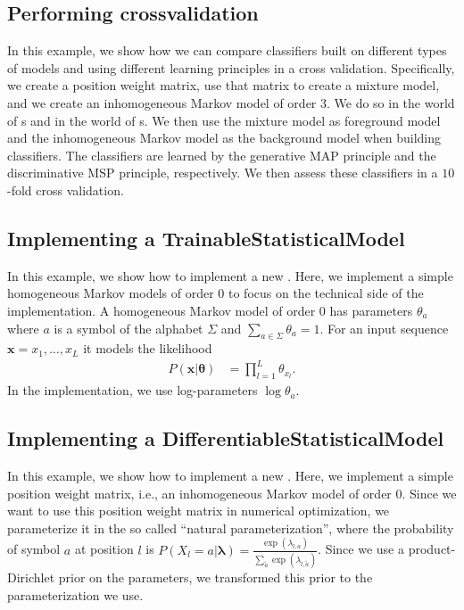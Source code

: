 \subsection{Performing crossvalidation}
In this example, we show how we can compare classifiers built on different types of models and using different learning principles in a cross validation. Specifically, we create a position weight matrix, use that matrix to create a mixture model, and we create an inhomogeneous Markov model of order $3$. We do so in the world of \TrainSM s and in the world of \DiffSM s. We then use the mixture model as foreground model and the inhomogeneous Markov model as the background model when building classifiers. The classifiers are learned by the generative MAP principle and the discriminative MSP principle, respectively. 
We then assess these classifiers in a $10$-fold cross validation.
\renewcommand{\codefile}{./recipes/Crossvalidation.java}
\setcounter{off}{62}

\subsection{Implementing a TrainableStatisticalModel}
In this example, we show how to implement a new \TrainSM. Here, we implement a simple homogeneous Markov models of order $0$ to focus on the technical side of the implementation. A homogeneous Markov model of order $0$ has parameters $\theta_a$ where $a$ is a symbol of the alphabet $\Sigma$ and $\sum_{a \in \Sigma} \theta_a = 1$. For an input sequence $\mathbf{x} = x_1,\ldots,x_L$ it models the likelihood
\begin{align*}
P(\mathbf{x}|\boldsymbol{\theta}) &= \prod_{l=1}^{L} \theta_{x_l}.
\end{align*}
In the implementation, we use log-parameters $\log \theta_a$.
\renewcommand{\codefile}{recipes/HomogeneousMarkovModel.java}
\setcounter{off}{35}

\subsection{Implementing a DifferentiableStatisticalModel}
In this example, we show how to implement a new \DiffSM. Here, we implement a simple position weight matrix, i.e., an inhomogeneous Markov model of order $0$. Since we want to use this position weight matrix in numerical optimization, we parameterize it in the so called ``natural parameterization'', where the probability of symbol $a$ at position $l$ is $P(X_l=a | \boldsymbol{\lambda}) = \frac{\exp(\lambda_{l,a})}{ \sum_{\tilde{a}} \exp(\lambda_{l,\tilde{a}}) }$. Since we use a product-Dirichlet prior on the parameters, we transformed this prior to the parameterization we use.

